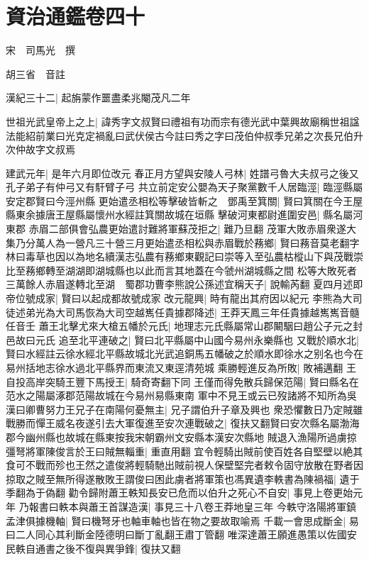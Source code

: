 \chapter{資治通鑑卷四十}
宋　司馬光　撰

胡三省　音註

漢紀三十二|{
	起旃蒙作噩盡柔兆閹茂凡二年}


世祖光武皇帝上之上|{
	諱秀字文叔賢曰禮祖有功而宗有德光武中葉興故廟稱世祖諡法能紹前業曰光克定禍亂曰武伏侯古今註曰秀之字曰茂伯仲叔季兄弟之次長兄伯升次仲故字文叔焉}


建武元年|{
	是年六月即位改元}
春正月方望與安陵人弓林|{
	姓譜弓魯大夫叔弓之後又孔子弟子有仲弓又有馯臂子弓}
共立前定安公嬰為天子聚黨數千人居臨涇|{
	臨涇縣屬安定郡賢曰今涇州縣}
更始遣丞相松等擊破皆斬之　鄧禹至箕關|{
	賢曰箕關在今王屋縣東余據唐王屋縣屬懷州水經註箕關故城在垣縣}
擊破河東都尉進圍安邑|{
	縣名屬河東郡}
赤眉二部俱會弘農更始遣討難將軍蘇茂拒之|{
	難乃旦翻}
茂軍大敗赤眉衆遂大集乃分萬人為一營凡三十營三月更始遣丞相松與赤眉戰於蓩鄉|{
	賢曰蓩音莫老翻字林曰毒草也因以為地名續漢志弘農有蓩鄉東觀記曰崇等入至弘農枯樅山下與茂戰崇比至蓩鄉轉至湖湖即湖城縣也以此而言其地蓋在今虢州湖城縣之間}
松等大敗死者三萬餘人赤眉遂轉北至湖　蜀郡功曹李熊說公孫述宜稱天子|{
	說輸芮翻}
夏四月述即帝位號成家|{
	賢曰以起成都故號成家}
改元龍興|{
	時有龍出其府因以紀元}
李熊為大司徒述弟光為大司馬恢為大司空越嶲任貴據郡降述|{
	王莽天鳳三年任貴據越嶲嶲音髓任音壬}
蕭王北擊尤來大槍五幡於元氏|{
	地理志元氏縣屬常山郡闞駰曰趙公子元之封邑故曰元氏}
追至北平連破之|{
	賢曰北平縣屬中山國今易州永樂縣也}
又戰於順水北|{
	賢曰水經註云徐水經北平縣故城北光武追銅馬五幡破之於順水即徐水之别名也今在易州括地志徐水過北平縣界而東流又東逕清苑城}
乘勝輕進反為所敗|{
	敗補邁翻}
王自投高岸突騎王豐下馬授王|{
	騎奇寄翻下同}
王僅而得免散兵歸保范陽|{
	賢曰縣名在范水之陽屬涿郡范陽故城在今易州易縣東南}
軍中不見王或云已歿諸將不知所為吳漢曰卿曹努力王兄子在南陽何憂無主|{
	兄子謂伯升子章及興也}
衆恐懼數日乃定賊雖戰勝而憚王威名夜遂引去大軍復進至安次連戰破之|{
	復扶又翻賢曰安次縣名屬渤海郡今幽州縣也故城在縣東按我宋朝霸州文安縣本漢安次縣地}
賊退入漁陽所過虜掠彊弩將軍陳俊言於王曰賊無輜重|{
	重直用翻}
宜令輕騎出賊前使百姓各自堅壁以絶其食可不戰而殄也王然之遣俊將輕騎馳出賊前視人保壁堅完者敕令固守放散在野者因掠取之賊至無所得遂散敗王謂俊曰困此虜者將軍策也馮異遺李軼書為陳禍福|{
	遺于季翻為于偽翻}
勸令歸附蕭王軼知長安已危而以伯升之死心不自安|{
	事見上卷更始元年}
乃報書曰軼本與蕭王首謀造漢|{
	事見三十八卷王莽地皇三年}
今軼守洛陽將軍鎮孟津俱據機軸|{
	賢曰機弩牙也軸車軸也皆在物之要故取喻焉}
千載一會思成斷金|{
	易曰二人同心其利斷金陸德明曰斷丁亂翻王肅丁管翻}
唯深達蕭王願進愚策以佐國安民軼自通書之後不復與異爭鋒|{
	復扶又翻}
